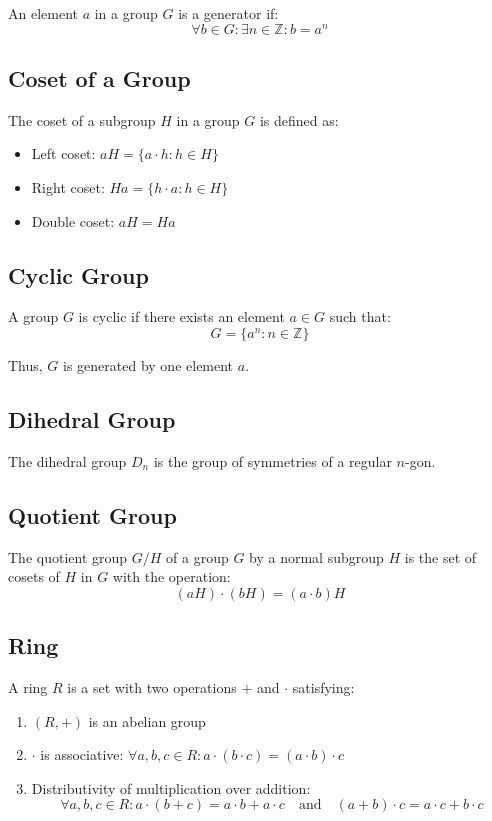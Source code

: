 \documentclass{article}
\begin{document}
An element \( a \) in a group \( G \) is a generator if:
\[ \forall b \in G: \exists n \in \mathbb{Z}: b = a^n \]

\subsection{Coset of a Group}

The coset of a subgroup \( H \) in a group \( G \) is defined as:
\begin{itemize}
    \item Left coset: \( aH = \{ a \cdot h : h \in H \} \)
    \item Right coset: \( Ha = \{ h \cdot a : h \in H \} \)
    \item Double coset: \( aH = Ha \)
\end{itemize}

\subsection{Cyclic Group}

A group \( G \) is cyclic if there exists an element \( a \in G \) such that:
\[ G = \{ a^n : n \in \mathbb{Z} \} \]

Thus, \( G \) is generated by one element \( a \).

\subsection{Dihedral Group}

The dihedral group \( D_n \) is the group of symmetries of a regular \( n \)-gon.

\subsection{Quotient Group}

The quotient group \( G/H \) of a group \( G \) by a normal subgroup \( H \) is the set of cosets of \( H \) in \( G \) with the operation:
\[ (aH) \cdot (bH) = (a \cdot b)H \]

\subsection{Ring}

A ring \( R \) is a set with two operations \( + \) and \( \cdot \) satisfying:
\begin{enumerate}
    \item \( (R, +) \) is an abelian group
    \item \( \cdot \) is associative: \( \forall a, b, c \in R: a \cdot (b \cdot c) = (a \cdot b) \cdot c \)
    \item Distributivity of multiplication over addition:
    \[ \forall a, b, c \in R: a \cdot (b + c) = a \cdot b + a \cdot c \quad \text{and} \quad (a + b) \cdot c = a \cdot c + b \cdot c \]
\end{enumerate}
\end{document}
